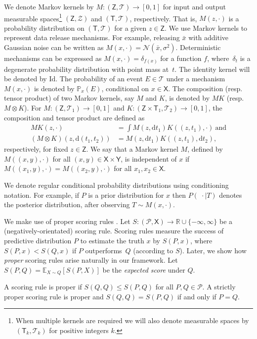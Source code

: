 \documentclass{article}
\theoremstyle{plain}
\theoremstyle{plain}
\theoremstyle{definition}
\theoremstyle{remark}
\theoremstyle{plain}
\newcommand{\cdotmid}{\;\cdot \mid}
\newcommand{\rmd}{\mathrm{d}}
\begin{document}
We denote Markov kernels by $M:(\mathsf{Z},\mathcal{T}) \rightarrow [0,1]$ for input and output measurable spaces\footnote{When multiple kernels are required we will also denote measurable spaces by $(\mathsf{T}_k,\mathcal{T}_k)$ for positive integers $k$.} $(\mathsf{Z},\mathcal{Z})$ and $(\mathsf{T},\mathcal{T})$, respectively. That is, $M(z,\cdot)$ is a probability distribution on $(\mathsf T, \mathcal T)$ for a given $z \in \mathsf{Z}$. We use Markov kernels to represent data release mechanisms. For example, releasing $\bar{x}$ with additive Gaussian noise can be written as $M(x,\cdot) = \mathcal{N}(\bar{x},\sigma^2)$. Deterministic mechanisms can be expressed as $M(x,\cdot) = \delta_{f(x)}$ for a function $f$, where~$\delta_{t}$ is a degenerate probability distribution with point mass at~$t$. The identity kernel will be denoted by $\mathrm{Id}$.
The probability of an event $E \in \mathcal{T}$ under a mechanism $M(x,\cdot)$ is denoted by $\mathbb{P}_x(E)$, conditional on $x \in \mathsf{X}$.
The composition (resp. tensor product) of two Markov kernels, say $M$ and $K$, is denoted by $MK$ (resp. $M \otimes K$). For $M:(\mathsf{Z},\mathcal{T}_1) \rightarrow [0,1]$ and $K:(\mathsf{Z}\times\mathsf{T}_1,\mathcal{T}_2)\rightarrow [0,1]$, the composition and tensor product are defined as
\begin{align*}
    MK(z,\cdot) &= \int M(z,\rmd t_1)K((z,t_1),\cdot)~\text{and}\\
    (M \otimes K)(z,\rmd(t_1,t_2)) &= M(z,\rmd t_1)K((z,t_1),\rmd t_2),
\end{align*}
respectively, for fixed $z \in \mathsf{Z}$.
We say that a Markov kernel $M$, defined by $M((x,y), \cdot)$ for all $(x,y) \in \mathsf{X}\times\mathsf{Y}$, is independent of $x$ if $M((x_1,y), \cdot)=M((x_2,y), \cdot)$ for all $x_1,x_2\in \mathsf{X}$.

We denote regular conditional probability distributions \citep[see e.g.,][]{durrettProbabilityTheoryExamples2019} using conditioning notation. For example, if $P$ is a prior distribution for $x$ then $P(\cdotmid T)$ denotes the posterior distribution, after observing $T \sim M(x,\cdot)$.

We make use of proper scoring rules \citep[see][for an overview]{gneiting2007strictly}. Let $S:(\mathcal{P},\mathsf{X}) \rightarrow \mathbb{R} \cup \{-\infty,\infty\}$ be a (negatively-orientated) scoring rule. Scoring rules measure the success of predictive distribution $P$ to estimate the truth $x$ by $S(P,x)$, where $S(P,x) < S(Q,x)$ if $P$ outperforms~$Q$ (according to $S$). Later, we show how \textit{proper} scoring rules arise naturally in our framework. Let $S(P,Q) = \mathbb{E}_{X\sim Q}[S(P,X)]$ be the \emph{expected score} under $Q$. 
\begin{definition}
     A scoring rule is proper if $S(Q,Q) \leq S(P,Q)$ for all $P,Q \in \mathcal{P}$.  A strictly proper scoring rule is proper and $S(Q,Q) = S(P,Q)$ if and only if $P=Q$.
\end{definition}
\end{document}
